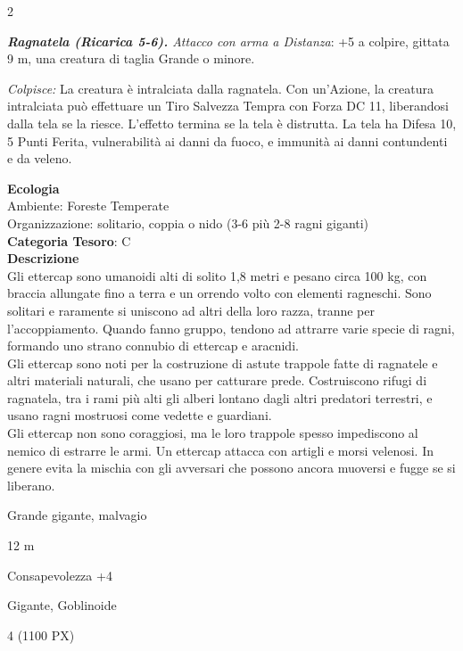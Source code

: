 \begin{multicols}{2}
{\emph{\textbf{Ragnatela (Ricarica 5-6).} Attacco con arma a Distanza}: +5 a colpire, gittata 9 m, una creatura di taglia Grande o minore.

\emph{Colpisce:} La creatura è intralciata dalla ragnatela. Con un'Azione, la creatura intralciata può effettuare un Tiro Salvezza Tempra con Forza DC 11, liberandosi dalla tela se la riesce. L'effetto termina se la tela è distrutta. La tela ha Difesa 10, 5 Punti Ferita, vulnerabilità ai danni da fuoco, e immunità ai danni contundenti e da veleno.

\textbf{Ecologia}\\
Ambiente: Foreste Temperate\\
Organizzazione: solitario, coppia o nido (3-6 più 2-8 ragni giganti)\\
\textbf{Categoria Tesoro}: C\\
\textbf{Descrizione}\\
Gli ettercap sono umanoidi alti di solito 1,8 metri e pesano circa 100 kg, con braccia allungate fino a terra e un orrendo volto con elementi ragneschi. Sono solitari e raramente si uniscono ad altri della loro razza, tranne per l'accoppiamento. Quando fanno gruppo, tendono ad attrarre varie specie di ragni, formando uno strano connubio di ettercap e aracnidi.\\
Gli ettercap sono noti per la costruzione di astute trappole fatte di ragnatele e altri materiali naturali, che usano per catturare prede. Costruiscono rifugi di ragnatela, tra i rami più alti gli alberi lontano dagli altri predatori terrestri, e usano ragni mostruosi come vedette e guardiani.\\
Gli ettercap non sono coraggiosi, ma le loro trappole spesso impediscono al nemico di estrarre le armi. Un ettercap attacca con artigli e morsi velenosi. In genere evita la mischia con gli avversari che possono ancora muoversi e fugge se si liberano.

\begin{description}[noitemsep, topsep=0pt, parsep=0pt, partopsep=0pt, itemsep=1pt, leftmargin=2.35cm,  labelwidth=2.2cm, itemindent=0cm, listparindent=0pt] %
\setlength{\baselineskip}{10pt}
\item[\textbf{Taglia/Tipo}] Grande gigante, malvagio
\item[\textbf{Caratt.}] 
\item[\textbf{Punti Ferita}] 
\item[\textbf{Movimento}] 12 m
\item[\textbf{Tiri Salvez.}] 
\item[\textbf{Comp.}] Consapevolezza +4
\item[\textbf{Sensi}] 
\item[\textbf{Linguaggi}] Gigante, Goblinoide
\item[\textbf{Sfida}] 4 (1100 PX)
\end{description}
\smallskip

}
\end{multicols}
